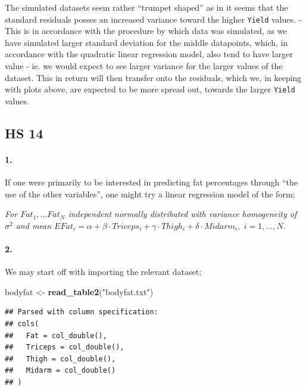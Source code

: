 \documentclass[
]{article}
\newenvironment{Shaded}{\begin{snugshade}}{\end{snugshade}}
\newcommand{\KeywordTok}[1]{\textcolor[rgb]{0.13,0.29,0.53}{\textbf{#1}}}
\newcommand{\NormalTok}[1]{#1}
\newcommand{\StringTok}[1]{\textcolor[rgb]{0.31,0.60,0.02}{#1}}
\begin{document}
The simulated datasets seem rather ``trumpet shaped'' as in it seems
that the standard residuals posses an increased variance toward the
higher \texttt{Yield} values. - This is in accordance with the procedure
by which data was simulated, as we have simulated larger standard
deviation for the middle datapoints, which, in accordance with the
quadratic linear regression model, also tend to have larger value - ie.
we would expect to see larger variance for the larger values of the
dataset. This in return will then transfer onto the residuals, which we,
in keeping with plots above, are expected to be more spread out, towards
the larger \texttt{Yield} values.

\hypertarget{hs-14}{%
\subsection{HS 14}\label{hs-14}}

\hypertarget{section-63}{%
\paragraph{\texorpdfstring{\textbf{1.}}{1.}}\label{section-63}}

If one were primarily to be interested in predicting fat percentages
through ``the use of the other variables'', one might try a linear
regression model of the form;

\emph{For \(Fat_1,\ldots Fat_N\) independent normally distributed with
variance homogeneity of \(\sigma^2\) and mean
\(EFat_i=\alpha+\beta\cdot Triceps_i+\gamma\cdot Thigh_i+\delta\cdot Midarm_i,\,\,i=1,\ldots,N.\)}

\hypertarget{section-64}{%
\paragraph{\texorpdfstring{\textbf{2.}}{2.}}\label{section-64}}

We may start off with importing the relevant dataset;

\begin{Shaded}
\begin{Highlighting}[]
\NormalTok{bodyfat <-}\StringTok{ }\KeywordTok{read_table2}\NormalTok{(}\StringTok{"bodyfat.txt"}\NormalTok{)}
\end{Highlighting}
\end{Shaded}

\begin{verbatim}
## Parsed with column specification:
## cols(
##   Fat = col_double(),
##   Triceps = col_double(),
##   Thigh = col_double(),
##   Midarm = col_double()
## )
\end{verbatim}
\end{document}
